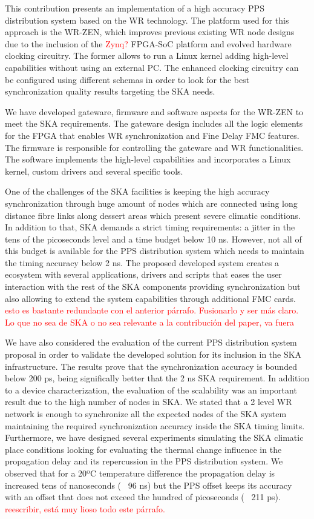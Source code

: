 This contribution presents an implementation of a high accuracy 
PPS distribution system based on the WR technology. The platform used for 
this approach is the WR-ZEN, which improves previous existing WR node designs 
due to the inclusion of the \textcolor{red}{Zynq?} FPGA-SoC platform and evolved hardware clocking 
circuitry. The former allows to run a Linux kernel adding high-level capabilities without using an external PC. The enhanced clocking circuitry can be configured using different schemas in order to look for the best synchronization quality results targeting the SKA needs. 

We have developed gateware, firmware and software aspects for the WR-ZEN to meet the SKA requirements. The gateware design includes all the logic elements for the FPGA that enables WR synchronization and Fine Delay FMC features. The firmware is responsible for controlling the gateware and WR functionalities. The software implements the high-level capabilities and incorporates a Linux kernel, custom drivers and several specific tools. 

One of the challenges of the SKA facilities is keeping the high accuracy 
synchronization through huge amount of nodes which are connected using long 
distance fibre links along dessert areas which present severe climatic 
conditions. In addition to that, SKA demands a strict timing requirements: a 
jitter in the tens of the picoseconds level and a time budget below 10 ns. 
However, not all of this budget is available for the PPS distribution system 
which needs to maintain the timing accuracy below 2 ns. The proposed developed 
system creates a ecosystem with several applications, drivers and scripts that 
eases the user interaction with the rest of the 
SKA components providing synchronization but also allowing to extend the system capabilities through additional FMC cards. \textcolor{red}{esto es bastante redundante con el anterior párrafo. Fusionarlo y ser más claro. Lo que no sea de SKA o no sea relevante a la contribución del paper, va fuera}

We have also considered the evaluation of the current PPS distribution system proposal 
in order to validate the developed solution for its inclusion in the SKA 
infrastructure. The results prove that the synchronization accuracy is bounded below 200 ps, being significally better that the 2 ns SKA requirement. In addition to a device characterization, 
the evaluation of the scalability was an important result due to the high 
number of nodes in SKA. We stated that a 2 level WR network is enough to 
synchronize all the expected nodes of the SKA system maintaining the required 
synchronization accuracy inside the SKA timing limits. Furthermore, we have 
designed several experiments simulating the SKA climatic place conditions 
looking for evaluating the thermal change influence in the propagation delay 
and its repercussion in the PPS distribution system. We observed that for a 
20ºC temperature difference the propagation delay is increased tens of 
nanoseconds (~ 96 ns) but the PPS offset keeps its accuracy with an offset that 
does not exceed the hundred of picoseconds (~ 211 ps).  \textcolor{red}{reescribir, está muy lioso todo este párrafo.}

